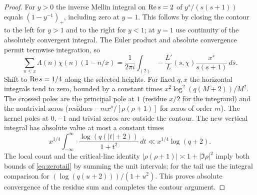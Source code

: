 \documentclass[11pt]{article}
\theoremstyle{remark}\newtheorem{remark}[theorem]{Remark}
\begin{document}
\begin{proof}
For $y>0$ the inverse Mellin integral on $\operatorname{Re} s=2$ of $y^s/(s(s+1))$ equals $(1-y^{-1})_+$, including zero at $y=1$. This follows by closing the contour to the left for $y>1$ and to the right for $y<1$; at $y=1$ use continuity of the absolutely convergent integral. The Euler product and absolute convergence permit termwise integration, so
\[
\sum_{n\le x}\Lambda(n)\chi(n)(1-n/x)
=\frac1{2\pi i}\int_{(2)}-\frac{L'}{L}(s,\chi)\frac{x^s}{s(s+1)}\,ds.
\]
Shift to $\operatorname{Re} s=1/4$ along the selected heights. For fixed $q,x$ the horizontal integrals tend to zero, bounded by a constant times $x^2\log^2(q(M+2))/M^2$. The crossed poles are the principal pole at $1$ (residue $x/2$ for the integrand) and the nontrivial zeros (residues $-m x^\rho/[\rho(\rho+1)]$ for zeros of order $m$). The kernel poles at $0,-1$ and trivial zeros are outside the contour. The new vertical integral has absolute value at most a constant times
\[
x^{1/4}\int_{-\infty}^{\infty}\frac{\log(q(|t|+2))}{1+t^2}\,dt
\ll x^{1/4}\log(q+2).
\]
The local count and the critical-line identity $|\rho(\rho+1)|\asymp1+|\Im\rho|^2$ imply both bounds of \eqref{eq:zerotail} by summing the unit intervals; for the tail use the integral comparison for $(\log(q(u+2)))/(1+u^2)$. This proves absolute convergence of the residue sum and completes the contour argument.
\end{proof}
\end{document}
